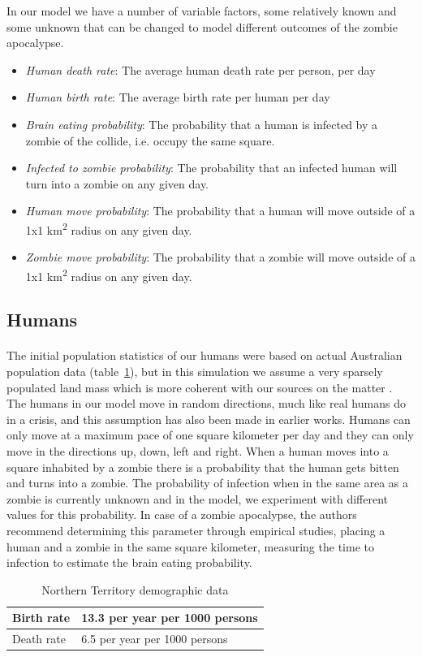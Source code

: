 \documentclass{report}
\begin{document}
In our model we have a number of variable factors, some relatively known and some unknown that can be changed to model different outcomes of the zombie apocalypse.

\begin{itemize}
\item \emph{Human death rate}: The average human death rate per person, per day
\item \emph{Human birth rate}: The average birth rate per human per day
\item \emph{Brain eating probability}: The probability that a human is infected by a zombie of the collide, i.e. occupy the same square.
\item \emph{Infected to zombie probability}: The probability that an infected human will turn into a zombie on any given day.
\item \emph{Human move probability}: The probability that a human will move outside of a 1x1 km\textsuperscript{2} radius on any given day.
\item \emph{Zombie move probability}: The probability that a zombie will move outside of a 1x1 km\textsuperscript{2} radius on any given day.
\end{itemize}

\subsection{Humans}
\paragraph{}
The initial population statistics of our humans were based on actual Australian population data (table~\ref{AustralianData}), but in this simulation we assume a very sparsely populated land mass which is more coherent with our sources on the matter\cite{zombieland} . The humans in our model move in random directions, much like real humans do in a crisis, and this assumption has also been made in earlier works\cite{munz}. Humans can only move at a maximum pace of one square kilometer per day and they can only move in the directions up, down, left and right. When a human moves into a square inhabited by a zombie there is a probability that the human gets bitten and turns into a zombie. The probability of infection when in the same area as a zombie is currently unknown and in the model, we experiment with different values for this probability. In case of a zombie apocalypse, the authors recommend determining this parameter through empirical studies, placing a human and a zombie in the same square kilometer, measuring the time to infection to estimate the brain eating probability.
\begin{table}[!h]
\centering
    \begin{tabular}{|l|l|}
      \hline
        Birth rate & 13.3 per year per 1000 persons \\
      \hline
        Death rate & 6.5 per year per 1000 persons \\
      \hline
\end{tabular}
\caption{Northern Territory demographic data}\label{AustralianData}
\end{table}
\end{document}
